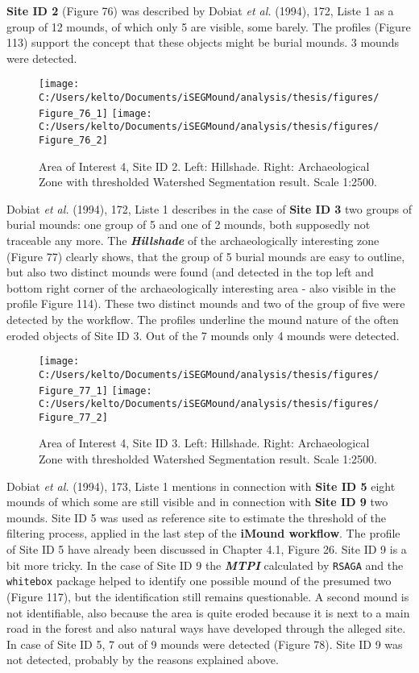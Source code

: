 \documentclass[
  12pt,
]{article}
\begin{document}
\textbf{Site ID 2} (Figure 76) was described by Dobiat \emph{et al.} (1994), 172, Liste 1 as a group of 12 mounds, of which only 5 are visible, some barely. The profiles (Figure 113) support the concept that these objects might be burial mounds. 3 mounds were detected.

\begin{figure}
\texttt{[image: C:/Users/kelto/Documents/iSEGMound/analysis/thesis/figures/Figure\_76\_1]} \texttt{[image: C:/Users/kelto/Documents/iSEGMound/analysis/thesis/figures/Figure\_76\_2]} \caption{Area of Interest 4, Site ID 2. Left: Hillshade. Right: Archaeological Zone with thresholded Watershed Segmentation result. Scale 1:2500.}\label{fig:Figure76}
\end{figure}

Dobiat \emph{et al.} (1994), 172, Liste 1 describes in the case of \textbf{Site ID 3} two groups of burial mounds: one group of 5 and one of 2 mounds, both supposedly not traceable any more. The \textbf{\emph{Hillshade}} of the archaeologically interesting zone (Figure 77) clearly shows, that the group of 5 burial mounds are easy to outline, but also two distinct mounds were found (and detected in the top left and bottom right corner of the archaeologically interesting area - also visible in the profile Figure 114). These two distinct mounds and two of the group of five were detected by the workflow. The profiles underline the mound nature of the often eroded objects of Site ID 3. Out of the 7 mounds only 4 mounds were detected.

\begin{figure}
\texttt{[image: C:/Users/kelto/Documents/iSEGMound/analysis/thesis/figures/Figure\_77\_1]} \texttt{[image: C:/Users/kelto/Documents/iSEGMound/analysis/thesis/figures/Figure\_77\_2]} \caption{Area of Interest 4, Site ID 3. Left: Hillshade. Right: Archaeological Zone with thresholded Watershed Segmentation result. Scale 1:2500.}\label{fig:Figure77}
\end{figure}

Dobiat \emph{et al.} (1994), 173, Liste 1 mentions in connection with \textbf{Site ID 5} eight mounds of which some are still visible and in connection with \textbf{Site ID 9} two mounds. Site ID 5 was used as reference site to estimate the threshold of the filtering process, applied in the last step of the \textbf{iMound workflow}. The profile of Site ID 5 have already been discussed in Chapter 4.1, Figure 26.
Site ID 9 is a bit more tricky. In the case of Site ID 9 the \textbf{\emph{MTPI}} calculated by \texttt{RSAGA} and the \texttt{whitebox} package helped to identify one possible mound of the presumed two (Figure 117), but the identification still remains questionable. A second mound is not identifiable, also because the area is quite eroded because it is next to a main road in the forest and also natural ways have developed through the alleged site.
In case of Site ID 5, 7 out of 9 mounds were detected (Figure 78). Site ID 9 was not detected, probably by the reasons explained above.
\end{document}
